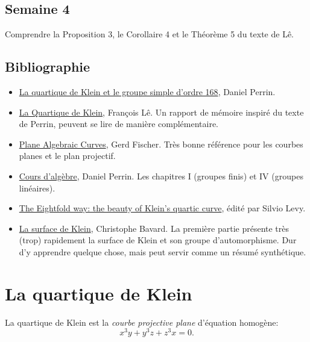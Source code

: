 \subsection{Semaine 4}
\label{sub:semaine_4}

Comprendre la Proposition 3, le  Corollaire 4 et le Théorème 5 du texte de Lê.



\subsection{Bibliographie}
\label{sub:bibliographie}

\begin{itemize}
	\item \href{../../ref_lecture/perrin_klein.pdf}{La quartique de Klein
		et le groupe simple d’ordre 168},
		Daniel Perrin.
	\item \href{../../ref_lecture/le.pdf}{La Quartique de Klein},
		François Lê.
		Un rapport de mémoire inspiré du texte de Perrin,
		peuvent se lire de manière complémentaire.
	\item \href{../../ref_lecture/fischer.pdf}{Plane Algebraic Curves},
		Gerd Fischer.
		Très bonne référence pour les courbes planes
		et le plan projectif.
	\item \href{../../ref_lecture/perrin_alg.pdf}{Cours d'algèbre},
		Daniel Perrin.
		Les chapitres I (groupes finis) et IV (groupes linéaires).
	\item \href{../../ref_lecture/levy.pdf}
		{The Eightfold way: the beauty of Klein's quartic curve},
		édité par Silvio Levy.
	\item \href{../../ref_lecture/bavard.pdf}{La surface de Klein},
		Christophe Bavard.
		La première partie présente très (trop) rapidement la surface de
		Klein et son groupe d'automorphisme.
		Dur d'y apprendre quelque chose, mais peut servir
		comme un résumé synthétique.
\end{itemize}
\section{La quartique de Klein}
\label{sec:quartique}

La quartique de Klein est la
\emph{courbe projective plane}
d'équation homogène:
\begin{equation}
	\label{eq:klein}
	x^3 y
	+
	y^3 z
	+
	z^3 x
	= 0
	.
\end{equation}

